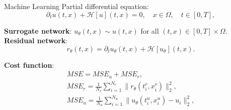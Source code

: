 \documentclass[9pt]{beamer}
\begin{document}
\begin{frame}{Machine Learning}
    Partial differential equation:
    \begin{equation*}
        \partial_t u\left(t,x\right) + \mathcal{H} \left[ u \right] \left(t, x\right) = 0, \quad x \in \Omega, \quad t \in \left[ 0, T \right], 
    \end{equation*}

    \textbf{Surrogate network}: $u_\theta \left(t, x \right) \sim u\left(t,x\right)$ for all $\left(t, x \right) \in \left[ 0, T \right] \times \Omega$. \\
    
    \textbf{Residual network}:
    \begin{equation*}
        r_{\theta} \left(t,x\right) = \partial_t u_{\theta} \left(t,x\right) + \mathcal{H} \left[ u_{\theta} \right] \left(t, x\right).
    \end{equation*}

    \textbf{Cost function}:
    \begin{equation*}
        \begin{gathered}
            MSE = MSE_u + MSE_r, \\
            MSE_r = \frac{1}{N_r} \sum^{N_r}_{i = 1} \lVert r_\theta \left(t^{r}_i, x^{r}_i\right) \rVert^{2}_{2}, \\
            MSE_u = \frac{1}{N_u} \sum^{N_u}_{i = 1} \lVert u_\theta\left(t^{u}_i, x^{u}_i\right) - u_i \rVert^{2}_{2},
        \end{gathered}
    \end{equation*}

\end{frame}

\end{document}
